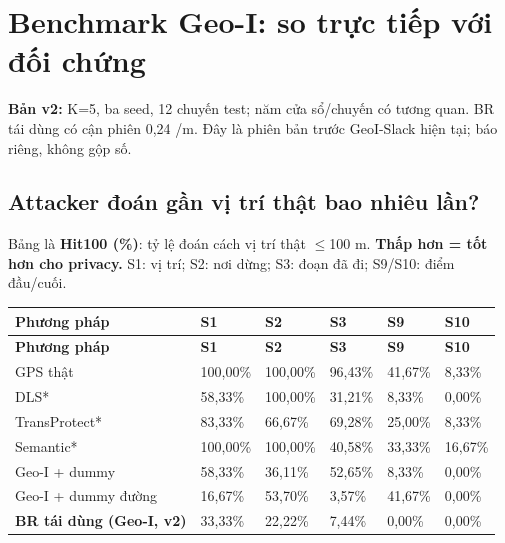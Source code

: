 \section{Benchmark Geo-I: so trực tiếp với đối chứng}
\textbf{Bản v2:} K=5, ba seed, 12 chuyến test; năm cửa sổ/chuyến có tương quan. BR tái dùng có cận phiên 0,24 /m. Đây là phiên bản trước GeoI-Slack hiện tại; báo riêng, không gộp số.

\subsection{Attacker đoán gần vị trí thật bao nhiêu lần?}
Bảng là \textbf{Hit100 (\%)}: tỷ lệ đoán cách vị trí thật $\le$100 m. \textbf{Thấp hơn = tốt hơn cho privacy.} S1: vị trí; S2: nơi dừng; S3: đoạn đã đi; S9/S10: điểm đầu/cuối.

\begingroup\small
\begin{longtable}{@{}P{3.364cm}P{2.486cm}P{2.486cm}P{2.486cm}P{2.486cm}P{2.486cm}@{}}
\toprule
\textbf{Phương pháp} & \textbf{S1} & \textbf{S2} & \textbf{S3} & \textbf{S9} & \textbf{S10}\\\midrule
\endfirsthead
\toprule
\textbf{Phương pháp} & \textbf{S1} & \textbf{S2} & \textbf{S3} & \textbf{S9} & \textbf{S10}\\\midrule
\endhead
\bottomrule\endfoot
GPS thật & 100,00\% & 100,00\% & 96,43\% & 41,67\% & 8,33\%\\
\addlinespace[3pt]
DLS* & 58,33\% & 100,00\% & 31,21\% & 8,33\% & 0,00\%\\
\addlinespace[3pt]
TransProtect* & 83,33\% & 66,67\% & 69,28\% & 25,00\% & 8,33\%\\
\addlinespace[3pt]
Semantic* & 100,00\% & 100,00\% & 40,58\% & 33,33\% & 16,67\%\\
\addlinespace[3pt]
Geo-I + dummy & 58,33\% & 36,11\% & 52,65\% & 8,33\% & 0,00\%\\
\addlinespace[3pt]
Geo-I + dummy đường & 16,67\% & 53,70\% & 3,57\% & 41,67\% & 0,00\%\\
\addlinespace[3pt]
\textbf{BR tái dùng (Geo-I, v2)} & 33,33\% & 22,22\% & 7,44\% & 0,00\% & 0,00\%\\
\end{longtable}
\endgroup
